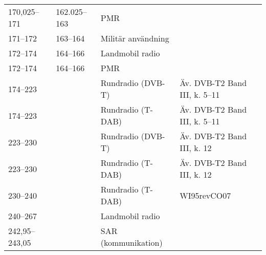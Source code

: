 \begin{landscape}
\begin{longtable}{llll}
	170,025--171       & 162.025--163       & PMR                                   &                                \\
	171--172           & 163--164           & Militär användning                    &                                \\
	172--174           & 164--166           & Landmobil radio                       &                                \\
	172--174           & 164--166           & PMR                                   &                                \\
	174--223           &                    & Rundradio (DVB-T)                     & Äv. DVB-T2 Band III, k. 5--11  \\
	174--223           &                    & Rundradio (T-DAB)                     & Äv. DVB-T2 Band III, k. 5--11  \\
	223--230           &                    & Rundradio (DVB-T)                     & Äv. DVB-T2 Band III, k. 12     \\
	223--230           &                    & Rundradio (T-DAB)                     & Äv. DVB-T2 Band III, k. 12     \\
	230--240           &                    & Rundradio (T-DAB)                     & WI95revCO07                    \\
	240--267           &                    & Landmobil radio                       &                                \\
	242,95--243,05     &                    & SAR (kommunikation)                   & 
\end{longtable}
\normalsize
\end{landscape}
